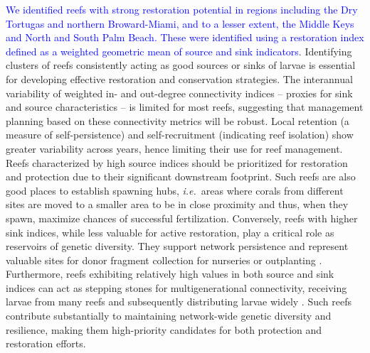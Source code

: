 \documentclass[preprint,12pt,authoryear]{elsarticle}
\newcommand{\modif}[1]{\textcolor{blue}{#1}}
\newcommand{\ie}{{\it i.e.}\ }
\begin{document}
	\modif{We identified reefs with strong restoration potential in regions including the Dry Tortugas and northern Broward-Miami, and to a lesser extent, the Middle Keys and North and South Palm Beach. These were identified using a restoration index defined as a weighted geometric mean of source and sink indicators}. Identifying clusters of reefs consistently acting as good sources or sinks of larvae is essential for developing effective restoration and conservation strategies. The interannual variability of weighted in- and out-degree connectivity indices -- proxies for sink and source characteristics -- is limited for most reefs, suggesting that management planning based on these connectivity metrics will be robust. Local retention (a measure of self-persistence) and self-recruitment (indicating reef isolation) show greater variability across years, hence limiting their use for reef management. Reefs characterized by high source indices should be prioritized for restoration and protection due to their significant downstream footprint. Such reefs are also good places to establish spawning hubs, \ie areas where corals from different sites are moved to a smaller area to be in close proximity and thus, when they spawn, maximize chances of successful fertilization. Conversely, reefs with higher sink indices, while less valuable for active restoration, play a critical role as reservoirs of genetic diversity. They support network persistence and represent valuable sites for donor fragment collection for nurseries or outplanting \citep{king2023larval}. Furthermore, reefs exhibiting relatively high values in both source and sink indices can act as stepping stones for multigenerational connectivity, receiving larvae from many reefs and subsequently distributing larvae widely \citep{frys2020fine}. Such reefs contribute substantially to maintaining network-wide genetic diversity and resilience, making them high-priority candidates for both protection and restoration efforts.
	
	
	
\end{document}

